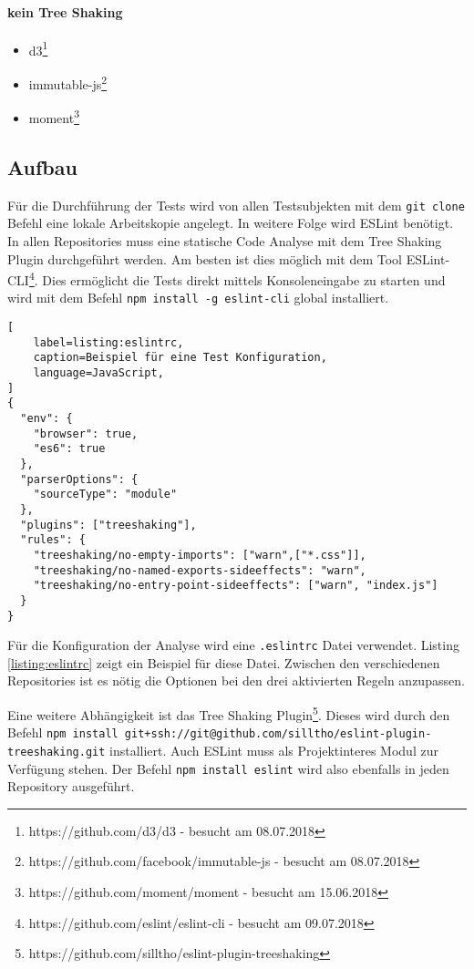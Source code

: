 \paragraph{kein Tree Shaking}
\begin{itemize}
\item d3\footnote{https://github.com/d3/d3 - besucht am 08.07.2018}
\item immutable-js\footnote{https://github.com/facebook/immutable-js - besucht am 08.07.2018}
\item moment\footnote{https://github.com/moment/moment - besucht am 15.06.2018}
\end{itemize}

\subsection{Aufbau}

Für die Durchführung der Tests wird von allen Testsubjekten mit dem \lstinline{git clone} Befehl eine lokale Arbeitskopie angelegt. In weitere Folge wird ESLint benötigt. In allen Repositories muss eine statische Code Analyse mit dem Tree Shaking Plugin durchgeführt werden. Am besten ist dies möglich mit dem Tool  ESLint-CLI\footnote{https://github.com/eslint/eslint-cli - besucht am 09.07.2018}. Dies ermöglicht die Tests direkt mittels Konsoleneingabe zu starten und wird mit dem Befehl \lstinline{npm install -g eslint-cli} global installiert.

\begin{lstlisting}[
    label=listing:eslintrc,
	caption=Beispiel für eine Test Konfiguration,
	language=JavaScript,
]
{
  "env": {
    "browser": true,
    "es6": true
  },
  "parserOptions": {
    "sourceType": "module"
  },
  "plugins": ["treeshaking"],
  "rules": {
    "treeshaking/no-empty-imports": ["warn",["*.css"]],
    "treeshaking/no-named-exports-sideeffects": "warn",
    "treeshaking/no-entry-point-sideeffects": ["warn", "index.js"]
  }
}
\end{lstlisting}

Für die Konfiguration der Analyse wird eine \lstinline{.eslintrc} Datei verwendet. Listing \ref{listing:eslintrc} zeigt ein Beispiel für diese Datei. Zwischen den verschiedenen Repositories ist es nötig die Optionen bei den drei aktivierten Regeln anzupassen.

Eine weitere Abhängigkeit ist das Tree Shaking Plugin\footnote{https://github.com/silltho/eslint-plugin-treeshaking}. Dieses wird durch den Befehl \lstinline{npm install git+ssh://git@github.com/silltho/eslint-plugin-treeshaking.git} installiert. Auch ESLint muss als Projektinteres Modul zur Verfügung stehen. Der Befehl \lstinline{npm install eslint} wird also ebenfalls in jeden Repository ausgeführt.

